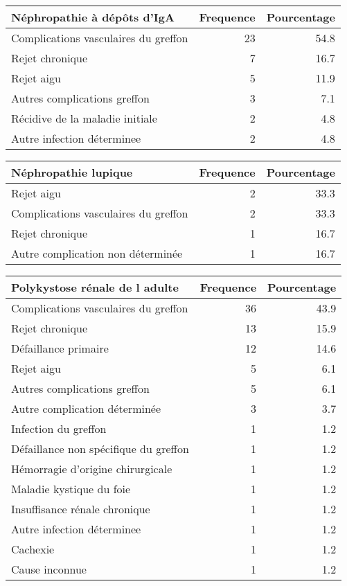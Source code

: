 \documentclass[11pt,a4paper]{article}\usepackage[]{graphicx}\usepackage[]{color}
\begin{document}
\begin{table}[H]
\centering
\begin{tabular}{lrr}
  \hline
Néphropathie à dépôts d'IgA & Frequence & Pourcentage \\ 
  \hline
Complications vasculaires du greffon & 23 & 54.8 \\ 
  Rejet chronique & 7 & 16.7 \\ 
  Rejet aigu & 5 & 11.9 \\ 
  Autres complications greffon & 3 & 7.1 \\ 
  Récidive de la maladie initiale & 2 & 4.8 \\ 
  Autre infection déterminee & 2 & 4.8 \\ 
   \hline
\end{tabular}
\end{table}
\begin{table}[H]
\centering
\begin{tabular}{lrr}
  \hline
Néphropathie lupique & Frequence & Pourcentage \\ 
  \hline
Rejet aigu & 2 & 33.3 \\ 
  Complications vasculaires du greffon & 2 & 33.3 \\ 
  Rejet chronique & 1 & 16.7 \\ 
  Autre complication non déterminée & 1 & 16.7 \\ 
   \hline
\end{tabular}
\end{table}
\begin{table}[H]
\centering
\begin{tabular}{lrr}
  \hline
Polykystose rénale de l adulte & Frequence & Pourcentage \\ 
  \hline
Complications vasculaires du greffon & 36 & 43.9 \\ 
  Rejet chronique & 13 & 15.9 \\ 
  Défaillance primaire & 12 & 14.6 \\ 
  Rejet aigu & 5 & 6.1 \\ 
  Autres complications greffon & 5 & 6.1 \\ 
  Autre complication déterminée & 3 & 3.7 \\ 
  Infection du greffon & 1 & 1.2 \\ 
  Défaillance non spécifique du greffon & 1 & 1.2 \\ 
  Hémorragie d'origine chirurgicale & 1 & 1.2 \\ 
  Maladie kystique du foie & 1 & 1.2 \\ 
  Insuffisance rénale chronique & 1 & 1.2 \\ 
  Autre infection déterminee & 1 & 1.2 \\ 
  Cachexie & 1 & 1.2 \\ 
  Cause inconnue & 1 & 1.2 \\ 
   \hline
\end{tabular}
\end{table}
\end{document}
